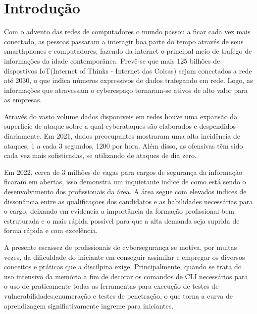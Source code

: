 \chapter{Introdução}
\label{sec:introducao}

        Com o advento das redes de computadores o mundo passou a ficar cada vez mais conectado,
        as pessoas passaram a interagir boa parte do tempo através de seus smarthphones e computadores, 
        fazendo da internet o principal meio de trafégo de informações da idade contemporânea.
        Prevê-se que mais 125 bilhões de dispostivos IoT(Internet of Thinks - Internet das Coisas) sejam conectados a rede até 2030,
        o que indica números expressivos de dados trafegando em rede. Logo, as informações que atravessam o cyberespaço 
        tornaram-se ativos de alto valor para as empresas.\citep{nizetic2020internet,fernandes2018segurancca} 

        Através do vasto volume dados disponiveis em redes houve uma expansão da superficie de ataque sobre a qual 
        cyberataques são elaborados e despendidos diariamente\citep{ahmad2023zero}. Em 2021, dados preocupantes mostraram uma alta incidência
        de ataques, 1 a cada 3 segundos, 1200 por hora. Além disso, as ofensivas têm sido cada vez mais sofisticadas,
        se utilizando de ataques de dia zero\citep{brooks2021more}.

        Em 2022, cerca de 3 milhões de vagas para cargos de segurança da informação ficaram em abertas, isso demonstra um
        inquietante indice de como está sendo o desenvolvimento dos profissionais da área. A área segue com elevados indices 
        de dissonância entre as qualificaçoes dos candidatos e as habilidades necessárias para o cargo, deixando em evidencia
        a importância da formação profissional bem estruturada e o mais rápida possível para que a alta demanda seja suprida 
        de forma rápida e com excelência\citep{goupil2022towards}.

        A presente escassez de profissionais de cybersegurança se motiva, por muitas vezes, da dificuldade do iniciante em 
        conseguir assimilar e empregar os diversos conceitos e práticas que a discilpina exige. Principalmente, quando se trata
        do uso intensivo da memória a fim de decorar os comandos de CLI necessários para o uso de praticamente todas as ferramentas
        para execução de testes de vulnerabilidades,enumeração e testes de penetração, o que torna a curva de aprendizagem signifiativamente ingreme
        para iniciantes\citep{alaryani2024penthack}.

